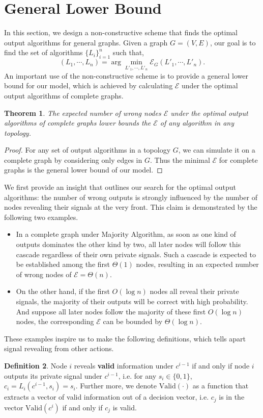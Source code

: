 \documentclass[a4paper,UKenglish]{lipics}
\newtheorem{thm}{Theorem}[section] %
\theoremstyle{definition}
\newtheorem{defn}[thm]{Definition}
\begin{document}
\section{General Lower Bound}
In this section, we design a non-constructive scheme that finds the optimal output algorithms for general graphs.
Given a graph $G = (V, E)$, our goal is to find the set of algorithms $\{L_i\}_{i=1}^{n}$ such that,
\begin{equation*}
	(L_1, \dotsb, L_n)
=
	\arg\min_{L'_1, \dotsb, L'_n} \mathcal{E}_{G}(L'_1,\dotsb, L'_n).
\end{equation*}
An important use of the non-constructive scheme is to provide a general lower bound for our model,
	 which is achieved by calculating $\mathcal{E}$ under the optimal output algorithms of complete graphs.

\begin{thm}
\label{thm:complete graphs bound}
The expected number of wrong nodes $\mathcal{E}$ under the optimal output algorithms of complete graphs
	 lower bounds the $\mathcal{E}$ of any algorithm in any topology.
\end{thm}
\begin{proof}
For any set of output algorithms in a topology $G$, we can simulate it on a complete graph by considering only edges in $G$.
Thus the minimal $\mathcal{E}$ for complete graphs is the general lower bound of our model.
\end{proof}

We first provide an insight that outlines our search for the optimal output algorithms:
	the number of wrong outputs is strongly influenced by the number of nodes revealing their signals at the very front.
This claim is demonstrated by the following two examples.
\begin{itemize}
\item In a complete graph under Majority Algorithm, 
		as soon as one kind of outputs dominates the other kind by two,
		all later nodes will follow this cascade regardless of their own private signals.
	Such a cascade is expected to be established among the first $\Theta(1)$ nodes,
		resulting in an expected number of wrong nodes of $\mathcal{E} = \Theta(n)$.
\item	On the other hand, if the first $O(\log n)$ nodes all reveal their private signals, 
		the majority of their outputs will be correct with high probability.
	And suppose all later nodes follow the majority of these first $O(\log n)$ nodes, 
		the corresponding $\mathcal{E}$ can be bounded by $\Theta(\log n)$.
\end{itemize}
These examples inspire us to make the following definitions, which tells apart signal revealing from other actions.
\begin{defn}
Node $i$ reveals \textbf{valid} information under $c^{i-1}$ 
	if and only if node $i$ outputs its private signal under $c^{i-1}$, 
	i.e. for any $s_i\in \{0,1\}$, $c_i = L_i(c^{i-1}, s_i) = s_i$.
Further more, we denote $\text{Valid}(\cdot)$ as a function that extracts a vector of valid information out of a decision vector, i.e. 
	$c_j$ is in the vector $\text{Valid}(c^{i})$ if and only if $c_j$ is valid.
\end{defn}
\end{document}
